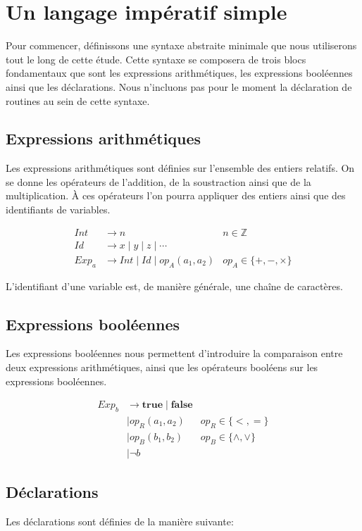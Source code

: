 \section{Un langage impératif simple}
Pour commencer, définissons une syntaxe abstraite minimale que nous utiliserons tout le long de cette étude. 
Cette syntaxe se composera de trois blocs fondamentaux que sont les expressions arithmétiques, les expressions 
booléennes ainsi que les déclarations. Nous n'incluons pas pour le moment la déclaration de routines au sein de cette syntaxe.

\subsection{Expressions arithmétiques}
Les expressions arithmétiques sont définies sur l'ensemble des entiers relatifs. On se donne les opérateurs 
de l'addition, de la soustraction ainsi que de la multiplication. À ces opérateurs l'on pourra appliquer des 
entiers ainsi que des identifiants de variables.

\begin{align*}
Int &\rightarrow n &n \in \mathbb{Z}\\
Id &\rightarrow x \mid y \mid z \mid \cdots \\
Exp_a &\rightarrow Int \mid Id \mid op_A(a_1, a_2) &op_A \in \{+, -, \times\}
\end{align*}

L'identifiant d'une variable est, de manière générale, une chaîne de caractères.

\subsection{Expressions booléennes}
Les expressions booléennes nous permettent d'introduire la comparaison entre deux expressions arithmétiques, 
ainsi que les opérateurs booléens sur les expressions booléennes.

\begin{align*}
Exp_b & \rightarrow \textbf{true} \mid \textbf{false} & \\
  & \mid op_R(a_1, a_2) & op_R \in \{<, =\} \\
  & \mid op_B(b_1, b_2) & op_B \in \{\wedge, \vee\} \\
  & \mid \neg b &
\end{align*}

\subsection{Déclarations}
Les déclarations sont définies de la manière suivante:

